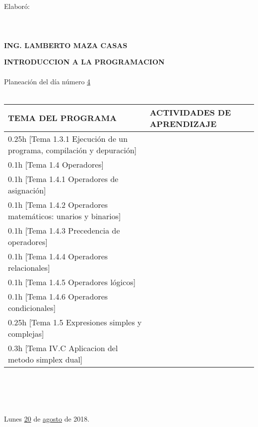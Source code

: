 \documentclass[landscape]{article}
\begin{document}
{\begin{center}
\ \\
\ \\
\ \\
\ \\
Elabor\'o:
\ \\
\ \\
\ \\
\ \\
{\bf ING. LAMBERTO MAZA CASAS}
\end{center}
\eject
\begin{center}
{\bf 
INTRODUCCION A LA PROGRAMACION
}
\ \\
\ \\
Planeaci\'on del d\'ia n\'umero \underline{\hspace{0.5cm}4\hspace{0.5cm}}
\ \\
\ \\
\begin{tabular}{|p{11cm}|p{8cm}|}\hline
{\bf TEMA DEL PROGRAMA}&{\bf ACTIVIDADES DE APRENDIZAJE}\\\hline
	0.25h	[Tema 1.3.1 Ejecuci\'on de un programa, compilaci\'on y depuraci\'on]
&\\
	0.1h	[Tema 1.4 Operadores]
&\\
	0.1h	[Tema 1.4.1 Operadores de asignaci\'on]
&\\
	0.1h	[Tema 1.4.2 Operadores matem\'aticos: unarios y binarios]
&\\
	0.1h	[Tema 1.4.3 Precedencia de operadores]
&\\
	0.1h	[Tema 1.4.4 Operadores relacionales]
&\\
	0.1h	[Tema 1.4.5 Operadores l\'ogicos]
&\\
	0.1h	[Tema 1.4.6 Operadores condicionales]
&\\
	0.25h	[Tema 1.5 Expresiones simples y complejas]
&\\
	0.3h	[Tema IV.C Aplicacion del metodo simplex dual]
&\\
\hline
\end{tabular}
\ \\
\ \\
\ \\
\ \\
Lunes \underline{\hspace{0.5cm}20\hspace{0.5cm}} de  \underline{\hspace{0.5cm}agosto\hspace{0.5cm}} de 2018.
\ \\
\ \\

\end{center}}
\end{document}
